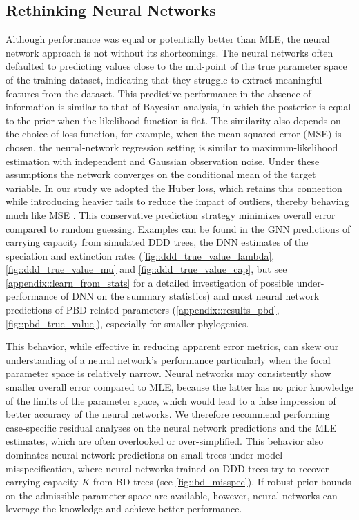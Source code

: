 {\subsection{Rethinking Neural Networks}
\label{ch2::sec::discussion::rethinking}
Although performance was equal or potentially better than MLE, the neural network approach is not without its shortcomings. The neural networks often defaulted to predicting values close to the mid-point of the true parameter space of the training dataset, indicating that they struggle to extract meaningful features from the dataset. This predictive performance in the absence of information is similar to that of Bayesian analysis, in which the posterior is equal to the prior when the likelihood function is flat. The similarity also depends on the choice of loss function, for example, when the mean-squared-error (MSE) is chosen, the neural-network regression setting is similar to maximum-likelihood estimation with independent and Gaussian observation noise. Under these assumptions the network converges on the conditional mean of the target variable. In our study we adopted the Huber loss, which retains this connection while introducing heavier tails to reduce the impact of outliers, thereby behaving much like MSE \citep{casella_statistical_2002, bishop_pattern_2006}. This conservative prediction strategy minimizes overall error compared to random guessing. Examples can be found in the GNN predictions of carrying capacity from simulated DDD trees, the DNN estimates of the speciation and extinction rates (\autoref{fig::ddd_true_value_lambda}, \autoref{fig::ddd_true_value_mu} and \autoref{fig::ddd_true_value_cap}, but see \autoref{appendix::learn_from_stats} for a detailed investigation of possible under-performance of DNN on the summary statistics) and most neural network predictions of PBD related parameters (\autoref{appendix::results_pbd}, \autoref{fig::pbd_true_value}), especially for smaller phylogenies. 

This behavior, while effective in reducing apparent error metrics, can skew our understanding of a neural network's performance particularly when the focal parameter space is relatively narrow. Neural networks may consistently show smaller overall error compared to MLE, because the latter has no prior knowledge of the limits of the parameter space, which would lead to a false impression of better accuracy of the neural networks. We therefore recommend performing case-specific residual analyses on the neural network predictions and the MLE estimates, which are often overlooked or over-simplified. This behavior also dominates neural network predictions on small trees under model misspecification, where neural networks trained on DDD trees try to recover carrying capacity $K$ from BD trees (see \autoref{fig::bd_misspec}). If robust prior bounds on the admissible parameter space are available, however, neural networks can leverage the knowledge and achieve better performance. 

}
